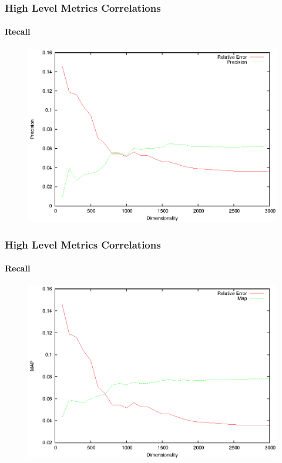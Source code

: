 \documentclass{beamer}
\begin{document}
\begin{frame}
\frametitle{High Level Metrics Correlations}
\framesubtitle{Recall}
 		\begin{figure}
		\includegraphics[scale=0.88]{precision.eps}
	\end{figure}
\end{frame}

\begin{frame}
\frametitle{High Level Metrics Correlations}
\framesubtitle{Recall}
 		\begin{figure}
		\includegraphics[scale=0.88]{map.eps}
	\end{figure}
\end{frame}
\end{document}
